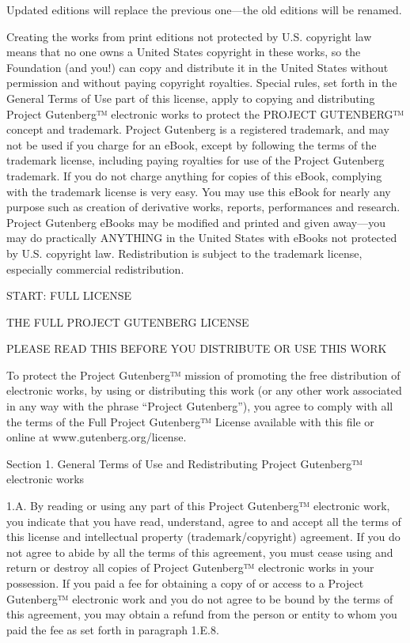 Updated editions will replace the previous one—the old editions will
be renamed.

Creating the works from print editions not protected by U.S. copyright
law means that no one owns a United States copyright in these works,
so the Foundation (and you!) can copy and distribute it in the United
States without permission and without paying copyright
royalties. Special rules, set forth in the General Terms of Use part
of this license, apply to copying and distributing Project
Gutenberg™ electronic works to protect the PROJECT GUTENBERG™
concept and trademark. Project Gutenberg is a registered trademark,
and may not be used if you charge for an eBook, except by following
the terms of the trademark license, including paying royalties for use
of the Project Gutenberg trademark. If you do not charge anything for
copies of this eBook, complying with the trademark license is very
easy. You may use this eBook for nearly any purpose such as creation
of derivative works, reports, performances and research. Project
Gutenberg eBooks may be modified and printed and given away—you may
do practically ANYTHING in the United States with eBooks not protected
by U.S. copyright law. Redistribution is subject to the trademark
license, especially commercial redistribution.


START: FULL LICENSE

THE FULL PROJECT GUTENBERG LICENSE

PLEASE READ THIS BEFORE YOU DISTRIBUTE OR USE THIS WORK

To protect the Project Gutenberg™ mission of promoting the free
distribution of electronic works, by using or distributing this work
(or any other work associated in any way with the phrase “Project
Gutenberg”), you agree to comply with all the terms of the Full
Project Gutenberg™ License available with this file or online at
www.gutenberg.org/license.

Section 1. General Terms of Use and Redistributing Project Gutenberg™
electronic works

1.A. By reading or using any part of this Project Gutenberg™
electronic work, you indicate that you have read, understand, agree to
and accept all the terms of this license and intellectual property
(trademark/copyright) agreement. If you do not agree to abide by all
the terms of this agreement, you must cease using and return or
destroy all copies of Project Gutenberg™ electronic works in your
possession. If you paid a fee for obtaining a copy of or access to a
Project Gutenberg™ electronic work and you do not agree to be bound
by the terms of this agreement, you may obtain a refund from the person
or entity to whom you paid the fee as set forth in paragraph 1.E.8.


